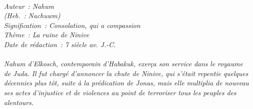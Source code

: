 \BFont
\noindent\hrulefill
{\footnotesize
\textit{
\bigskip
{\centering{}
\\Auteur~: Nahum
\\(Heb.~: Nachuwm)
\\Signification~: Consolation, qui a compassion
\\Thème~: La ruine de Ninive
\\Date de rédaction~: 7 siècle av. J.-C.\\}
}
\textit{
\\Nahum d'Elkosch, contemporain d'Habakuk, exerça son service dans le royaume de Juda. Il fut chargé d'annoncer la chute de Ninive, qui s'était repentie quelques décennies plus tôt, suite à la prédication de Jonas, mais elle multiplia de nouveau ses actes d'injustice et de violences au point de terroriser tous les peuples des alentours.\bigskip
}
}
\par\nobreak\noindent\hrulefill
